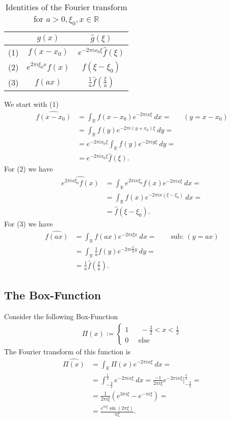 \documentclass[a4paper]{article}
\begin{document}
\begin{table}[h!]
\centering
\begin{tabular}{| l | c | c |}
\hline
  & $g(x)$ & $\hat{g}(\xi)$ \\ \hline \hline
(1) & $f(x-x_0)$ & $e^{-2\pi ix_0 \xi} \hat{f}(\xi)$ \\ \hline
(2) & $e^{2\pi i \xi_0 x} f(x)$ & $f(\xi - \xi_0)$ \\ \hline
(3) & $f(ax)$ & $\frac{1}{a} \hat{f}(\frac{\xi}{a})$\\ \hline
\end{tabular}
    \caption{Identities of the Fourier transform for $a > 0,
    \xi_0, x \in \mathbb{R}$}
\end{table}
We start with (1)
\begin{align}
    \widehat{f(x-x_0)}
    &= \int_\mathbb{R} f(x-x_0) e^{-2\pi i x \xi}\ dx=
    \;\;\;\;\;\; (y = x-x_0)\\
    &= \int_\mathbb{R} f(y) e^{-2\pi i (y+x_0) \xi}\
    dy=\\
    &= e^{-2\pi i x_0 \xi} \int_\mathbb{R}f(y)e^{-2\pi i y
    \xi}\ dy=\\
    &= e^{-2\pi i x_0 \xi} \hat{f}(\xi).
\end{align}
For (2) we have
\begin{align}
    \widehat{e^{2\pi i x \xi_0} f(x)}
    &= \int_\mathbb{R} e^{2\pi i x \xi_0} f(x) e^{-2\pi i x \xi}\ dx =\\
    &= \int_\mathbb{R} f(x) e^{-2\pi i x (\xi -\xi_0)}\ dx=\\
    &= \hat{f}(\xi - \xi_0).
\end{align}
For (3) we have
\begin{align}
    \widehat{f(ax)}
    &= \int_\mathbb{R} f(ax) e^{-2\pi i \xi x}\ dx = \qquad \text{sub:
        $(y=ax)$}\\
    &= \int_\mathbb{R} \frac{1}{a}f(y) e^{-2\pi i \frac{\xi}{a} y}\ dy=\\
    &= \frac{1}{a} \hat{f}\left(\frac{\xi}{a}\right).
\end{align}
\subsection{The Box-Function}
Consider the following Box-Function
\begin{align}
    \Pi(x) :=
    \begin{cases}
        1\;\;\;\;\;\; -\frac{3}{2} < x < \frac{1}{2}\\
        0\;\;\;\;\; \text{else}
    \end{cases}
\end{align}
The Fourier transform of this function is
\begin{align}
    \widehat{\Pi(x)}
    &= \int_\mathbb{R} \Pi(x) e^{-2\pi i x\xi}\ dx=\\
    &= \int_{-\frac{3}{2}}^{\frac{1}{2}} e^{-2\pi i x \xi}\ dx
    =\frac{-1}{2\pi i \xi} e^{-2\pi i x\xi}
    \bigg|_{-\frac{3}{2}}^{\frac{1}{2}}=\\
    &= \frac{1}{2\pi i \xi} \left(e^{3\pi i \xi} - e^{-\pi i \xi}\right)=\\
    &= \frac{e^{\pi i \xi}\sin(2\pi\xi)}{\pi \xi}.
\end{align}

\end{document}
